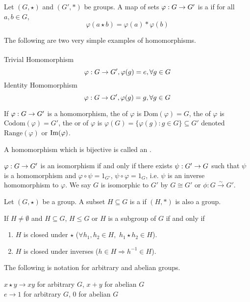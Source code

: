 \documentclass[11pt,letterpaper]{jacky}
\begin{document}
\begin{bdefi}
    Let $(G,\star)$ and $(G',\ast)$ be groups. A map of sets $\hmap{G}{G'}$ is a  if for all $a,b\in G$,
    $$\varphi(a\star b)=\varphi(a)\ast\varphi(b)$$
\end{bdefi}

\begin{ex}
    The following are two very simple examples of homomorphisms.\\\\
    Trivial Homomorphism
    $$\hmap{G}{G'},\varphi(g)=e,\forall g\in G$$
    Identity Homomorphism
    $$\hmap{G}{G'},\varphi(g)=g,\forall g\in G$$
\end{ex}

\begin{defi}
    If $\hmap{G}{G'}$ is a homomorphism, the  of $\varphi$ is $\text{Dom}(\varphi)=G$, the  of $\varphi$ is $\text{Codom}(\varphi)=G'$, the  or  of $\varphi$ is $\varphi(G)=\{\varphi(g):g\in G\}\subseteq G'$ denoted $\text{Range}(\varphi)$ or $\im$.
\end{defi}

\begin{bdefi}
    A homomorphism which is bijective is called an .
\end{bdefi}

$\hmap{G}{G'}$ is an isomorphism if and only if there exists $\hmap[\psi]{G'}{G}$ such that $\psi$ is a homomorphism and $\varphi\circ\psi=1_{G'}$, $\psi\circ\varphi=1_{G}$, i.e. $\psi$ is an inverse homomorphism to $\varphi$. We say $G$ is isomorphic to $G'$ by $G\cong G'$ or $\phi:G\xrightarrow{\sim}G'$.

\begin{bdefi}
    Let $(G,\star)$ be a group. A subset $H\subseteq G$ is a  if $(H,\ast)$ is also a group.
\end{bdefi}

If $H\ne\emptyset$ and $H\subseteq G$, $H\le G$ or $H$ is a subgroup of $G$ if and only if
\begin{enumerate}
    \item $H$ is closed under $\star$ ($\forall h_1,h_2\in H$,\ $h_1\star h_2\in H$).
    \item $H$ is closed under inverses ($h\in H\Rightarrow h^{-1}\in H$).
\end{enumerate}

\begin{note}
    The following is notation for arbitrary and abelian groups.
    \begin{center}
        $x\star y\rightarrow xy$ for arbitrary $G$, $x+y$ for abelian $G$\\
        $e\rightarrow1$ for arbitrary $G$, 0 for abelian $G$
    \end{center}
\end{note}
\end{document}
